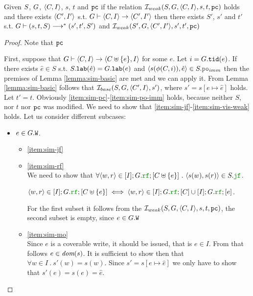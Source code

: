 \documentclass[12pt]{article}
\begin{document}
\begin{lemma}
  Given $S$, $G$, $\langle C, I \rangle$, $s$, $t$ and ${\mathtt{pc}}$
  if the relation $\mathcal{I}_{weak}(S, G, \langle C, I \rangle, s, t, {\mathtt{pc}})$ holds and 
  there exists $\langle C', I' \rangle$
  s.t. $G \vdash \langle C, I \rangle \rightarrow \langle C', I' \rangle$
  then there exists $S'$, $s'$ and $t'$ s.t. $G \vdash (s, t, S) \longrightarrow^* (s', t', S')$
  and $\mathcal{I}_{weak}(S', G, \langle C', I' \rangle, s', t', {\mathtt{pc}})$ 
\end{lemma}

\begin{proof}
  Note that ${\mathtt{pc}}$ 
  
  First, suppose that 
  $G \vdash \langle C, I \rangle \rightarrow \langle C \uplus \{e\}, I \rangle$ for some $e$.
  Let $i = G.{\mathtt{tid}}(e)$.
  If there exists $\hat{e} \in S$ s.t. $S.{\mathtt{lab}}(\hat{e}) = G.{\mathtt{lab}}(e)$ and 
  $\tup{s(\front(C, i)), \hat{e}} \in S.\lPO_{imm}$
  then the premises of Lemma \ref{lemma:sim-basic} are met and we can apply it.
  From Lemma \ref{lemma:sim-basic} follows that $\mathcal{I}_{base}(S, G, \langle C', I \rangle, s')$,
  where $s' = s[e \mapsto \hat{e}]$ holds.
  Let $t' = t$.
  Obviously \ref{item:sim-pc}-\ref{item:sim-po-imm} holds,
  because neither $S$, nor $t$ nor ${\mathtt{pc}}$ was modified. 
  We need to show that \ref{item:sim-jf}-\ref{item:sim-vis-weak} holds.
  Let us consider different subcases:
  \begin{itemize}
  \item $e \in G.{\mathtt{W}}$.
    \begin{itemize}

    \item \ref{item:sim-jf} \\

    \item \ref{item:sim-rf} \\
      We need to show that
      $\forall{\tup{w, r} \in [\lI];\lG.\lRF;[\lC \uplus\{e\}]} ~.~
      \tup{s(w), s(r)} \in \lES.\lJF
      $.
      
      $\tup{w, r} \in [\lI];\lG.\lRF;[\lC \uplus\{e\}] \iff
      \tup{w, r} \in [\lI];\lG.\lRF;[\lC] \cup  [\lI];\lG.\lRF;[e]
      $.
      
      For the first subset it follows from the $\mathcal{I}_{weak}(S, G, \langle C, I \rangle, s, t, {\mathtt{pc}})$,
      the second subset is empty, since $e \in G.{\mathtt{W}}$

    \item \ref{item:sim-mo} \\
      Since $e$ is a coverable write, it should be issued, that is $e \in I$.
      From that follows $e \in \textit{dom}{({s})}$.
      It is sufficient to show then that $\forall{w \in I} ~.~ s'(w) = s(w)$.
      Since $s' = s[e \mapsto \hat{e}]$ we only have to show that $s'(e) = s(e) = \hat{e}$.
      

\end{itemize}
\end{itemize}
\end{proof}
\end{document}
